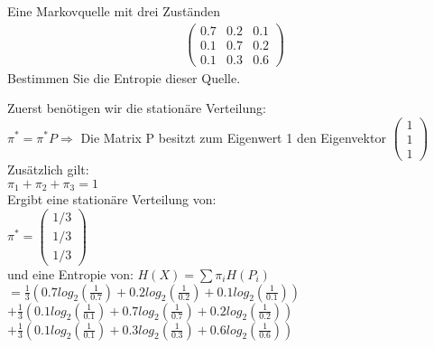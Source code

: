 \begin{uebsp}
\begin{Exercise}[label=ex:11.1]
Eine Markovquelle mit drei Zuständen
\begin{align}\begin{pmatrix}
0.7 & 0.2 & 0.1 \\ 
0.1 & 0.7 & 0.2 \\ 
0.1 & 0.3 & 0.6
\end{pmatrix}
\end{align}
Bestimmen Sie die Entropie dieser Quelle.
\end{Exercise}
\begin{Answer}
Zuerst benötigen wir die stationäre Verteilung:\\
$\pi^* = \pi^* P \Rightarrow$
Die Matrix P besitzt zum Eigenwert 1 den Eigenvektor 
$\begin{pmatrix}
1\\
1\\
1
\end{pmatrix}$\\
Zusätzlich gilt:\\
$\pi_1 + \pi_2 + \pi_3 = 1$\\

Ergibt eine stationäre Verteilung von:\\
$\pi^* = \begin{pmatrix}
1/3\\
1/3\\
1/3
\end{pmatrix}$\\

und eine Entropie von:
$H(X) = \sum \pi_i H(P_i)$\\
$\displaystyle = \frac{1}{3} (0.7 log_2(\frac{1}{0.7}) + 0.2 log_2(\frac{1}{0.2}) + 0.1 log_2(\frac{1}{0.1}))$\\


$\displaystyle + \frac{1}{3} (0.1 log_2(\frac{1}{0.1}) + 0.7 log_2(\frac{1}{0.7}) + 0.2 log_2(\frac{1}{0.2}))$\\


$\displaystyle + \frac{1}{3} (0.1 log_2(\frac{1}{0.1}) + 0.3 log_2(\frac{1}{0.3}) + 0.6 log_2(\frac{1}{0.6}))$
\end{Answer}
\end{uebsp}

